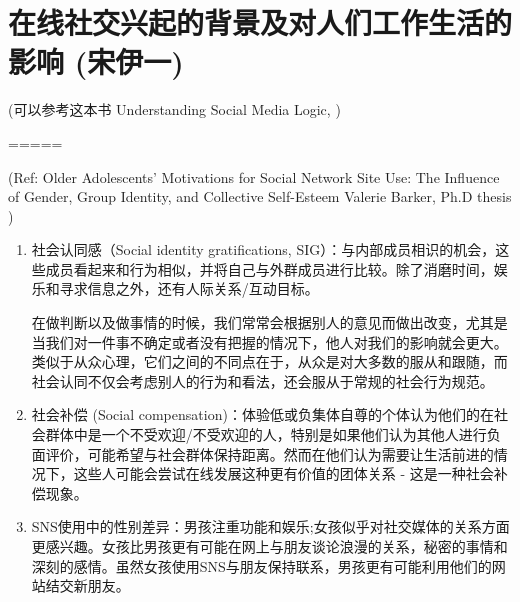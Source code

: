 
\color{olive}
\section{ 在线社交兴起的背景及对人们工作生活的影响  {(宋伊一)}
}


 (可以参考这本书 Understanding Social Media Logic, \cite{DijckPoell2013})

=====

(Ref: Older Adolescents’ Motivations for Social Network Site Use: The Influence of Gender, Group Identity, and Collective Self-Esteem
Valerie Barker, Ph.D thesis )


\begin{enumerate}
\item 社会认同感（Social identity gratifications, SIG）：与内部成员相识的机会，这些成员看起来和行为相似，并将自己与外群成员进行比较。除了消磨时间，娱乐和寻求信息之外，还有人际关系/互动目标。

在做判断以及做事情的时候，我们常常会根据别人的意见而做出改变，尤其是当我们对一件事不确定或者没有把握的情况下，他人对我们的影响就会更大。类似于从众心理，它们之间的不同点在于，从众是对大多数的服从和跟随，而社会认同不仅会考虑别人的行为和看法，还会服从于常规的社会行为规范。


\item 
社会补偿 (Social compensation)：体验低或负集体自尊的个体认为他们的在社会群体中是一个不受欢迎/不受欢迎的人，特别是如果他们认为其他人进行负面评价，可能希望与社会群体保持距离。然而在他们认为需要让生活前进的情况下，这些人可能会尝试在线发展这种更有价值的团体关系 - 这是一种社会补偿现象。

\item %
SNS使用中的性别差异：男孩注重功能和娱乐;女孩似乎对社交媒体的关系方面更感兴趣。女孩比男孩更有可能在网上与朋友谈论浪漫的关系，秘密的事情和深刻的感情。虽然女孩使用SNS与朋友保持联系，男孩更有可能利用他们的网站结交新朋友。

\end{enumerate}

